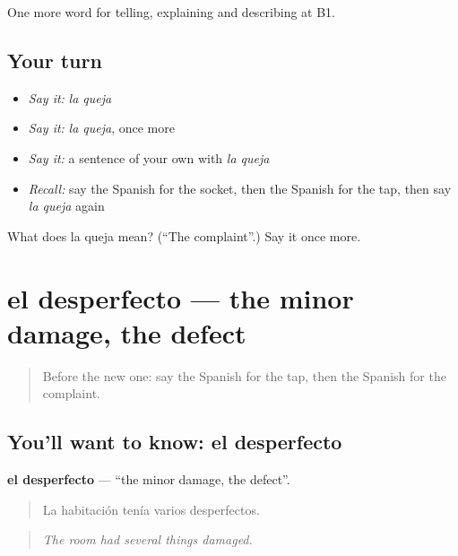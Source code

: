 \begin{grammarlens}[title={What you've built}]
One more word for telling, explaining and describing at B1.
\end{grammarlens}

\subsection*{Your turn}
\begin{itemize}
\raggedright
  \item \emph{Say it:} \emph{la queja}
  \item \emph{Say it:} \emph{la queja}, once more
  \item \emph{Say it:} a sentence of your own with \emph{la queja}
  \item \emph{Recall:} say the Spanish for the socket, then the Spanish for the tap, then say \emph{la queja} again
\end{itemize}

\begin{tcolorbox}[breakable,colback=teal!4,colframe=teal!35!black,title={Before you move on}]
What does la queja mean? (\textquotedblleft{}The complaint\textquotedblright{}.) Say it once more.
\end{tcolorbox}
\section[el desperfecto]{el desperfecto — the minor damage, the defect}

\label{lesson:ES-C665-desperfecto}



\begin{quote}
Before the new one: say the Spanish for the tap, then the Spanish for the complaint.
\end{quote}

\subsection*{You'll want to know: el desperfecto}
\textbf{el desperfecto} — \textquotedblleft{}the minor damage, the defect\textquotedblright{}.

\begin{quote}
La habitación tenía varios desperfectos.
\end{quote}

\begin{quote}
\emph{The room had several things damaged.}
\end{quote}

